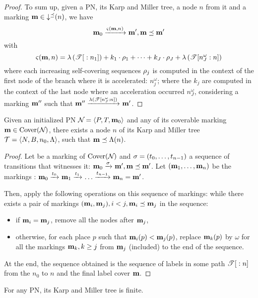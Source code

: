 \begin{proof}
  To sum up, given a \ac{PN}, its Karp and Miller tree, a node $n$ from it and a marking $\mar \in \downc{n}$, we have
  \[
    \mari \fire{\tts{\mar}{n}} \mar', \mar \preceq \mar'
  \]
  with
  \[
    \tts{\mar}{n} = \labt{\treepath{n_1}} + k_1 \cdot \iscs{1} + \dots + k_J \cdot \iscs{J} + \labt{\treepath[n^\omega_J]{n}}
  \]
  where each increasing self-covering sequences $\iscs{j}$ is computed in the context of the first node of the branch where it is accelerated: $n^\omega_j$;
  where the $k_j$ are computed in the context of the last node where an acceleration occurred $n^\omega_J$, considering a marking $\mar''$ such that
  \( \mar'' \fire{\labt{\treepath[n^\omega_J]{n}}} \mar' \).
\end{proof}

\begin{lemm}
  Given an initialized \ac{PN} $\defPN$ and any of its coverable marking $\mar \in \cover{\namePN}$,
  there exists a node $n$ of its Karp and Miller tree $\defT$, such that $\mar \preceq \lab{n}$.
\end{lemm}

\begin{proof}
  Let \mar be a marking of $\cover{\namePN}$ and $\defSeqt{0}{n-1}$ a sequence of transitions that witnesses it: \(\mari \fire{\seqt} \mar', \mar \preceq \mar'\).
  Let $\bodySeqm{1}{n}$ be the markings : \(\mari \fire{t_0} \mar_1 \fire{t_1} \dots \fire{t_{n-1}} \mar_n = \mar'\).

  Then, apply the following operations on this sequence of markings:
  while there exists a pair of markings \((\mar_i, \mar_j), i < j, \mar_i \preceq \mar_j\) in the sequence:
  \begin{itemize}
    \item if $\mar_i = \mar_j$, remove all the nodes after $\mar_j$,
    \item otherwise, for each place $p$ such that $\mar_i(p) < \mar_j(p)$, replace $\mar_k(p)$ by $\omega$ for all the markings $\mar_k, k \geq j$ from $\mar_j$ (included) to the end of the sequence.
  \end{itemize}

  At the end, the sequence obtained is the sequence of labels in some path $\treepath{n}$ from the $n_0$ to $n$ and the final label cover $\mar$.
\end{proof}

\begin{lemm}
  \label{theo:km-tree-finiteness}
  For any \ac{PN}, its Karp and Miller tree is finite.
\end{lemm}

